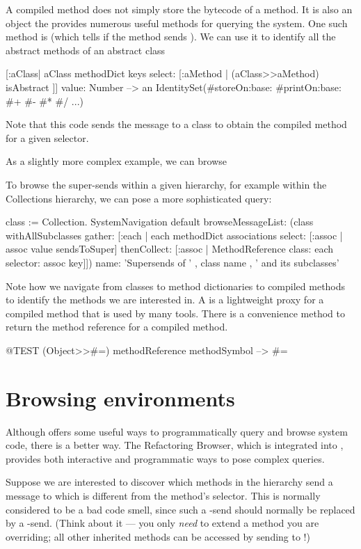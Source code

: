 \documentclass[a4paper,10pt,twoside]{book}
\begin{document}
A compiled method does not simply store the bytecode of a method.
It is also an object the provides numerous useful methods for querying the system.
One such method is  (which tells if the method sends ).
We can use it to identify all the abstract methods of an abstract class
\begin{code}{}
[:aClass| aClass methodDict keys select: [:aMethod |
  (aClass>>aMethod) isAbstract ]] value: Number
  --> an IdentitySet(#storeOn:base: #printOn:base: #+ #- #* #/ ...)
\end{code}
Note that this code sends the \ct{>>} message to a class to obtain the compiled method for a given selector.

As a slightly more complex example, we can browse 

To browse the super-sends within a given hierarchy, for example within the Collections hierarchy, we can pose a more sophisticated query:
\begin{code}{}
class := Collection.
SystemNavigation default
  browseMessageList: (class withAllSubclasses gather: [:each |
    each methodDict associations
      select: [:assoc | assoc value sendsToSuper]
      thenCollect: [:assoc | MethodReference class: each selector: assoc key]])
  name: 'Supersends of ' , class name , ' and its subclasses'
\end{code}
Note how we navigate from classes to method dictionaries to compiled methods to identify the methods we are interested in.
A  is a lightweight proxy for a compiled method that is used by many tools.
There is a convenience method  to return the method reference for a compiled method.
\begin{code}{@TEST}
(Object>>#=) methodReference methodSymbol --> #=
\end{code}

\section{Browsing environments}

Although  offers some useful ways to programmatically query and browse system code, there is a better way.  The Refactoring Browser, which is integrated into \pharo, provides both interactive and programmatic ways to pose complex queries.

Suppose we are interested to discover which methods in the  hierarchy send a message to \super which is different from the method's selector.
This is normally considered to be a bad code smell, since such a \super-send should normally be replaced by a \self-send. (Think about it --- you only \emph{need} \super to extend a method you are overriding; all other inherited methods can be accessed by sending to \self!)
\end{document}
